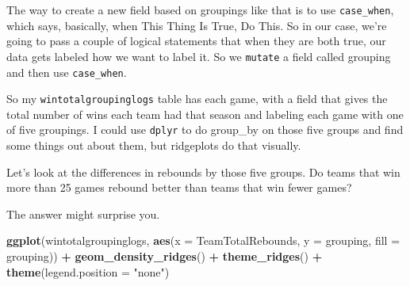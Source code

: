 \documentclass[]{book}
\newenvironment{Shaded}{\begin{snugshade}}{\end{snugshade}}
\newcommand{\DataTypeTok}[1]{\textcolor[rgb]{0.13,0.29,0.53}{#1}}
\newcommand{\DecValTok}[1]{\textcolor[rgb]{0.00,0.00,0.81}{#1}}
\newcommand{\KeywordTok}[1]{\textcolor[rgb]{0.13,0.29,0.53}{\textbf{#1}}}
\newcommand{\NormalTok}[1]{#1}
\newcommand{\OperatorTok}[1]{\textcolor[rgb]{0.81,0.36,0.00}{\textbf{#1}}}
\newcommand{\StringTok}[1]{\textcolor[rgb]{0.31,0.60,0.02}{#1}}
\begin{document}
The way to create a new field based on groupings like that is to use \texttt{case\_when}, which says, basically, when This Thing Is True, Do This. So in our case, we're going to pass a couple of logical statements that when they are both true, our data gets labeled how we want to label it. So we \texttt{mutate} a field called grouping and then use \texttt{case\_when}.

\begin{Shaded}
\end{Shaded}

So my \texttt{wintotalgroupinglogs} table has each game, with a field that gives the total number of wins each team had that season and labeling each game with one of five groupings. I could use \texttt{dplyr} to do group\_by on those five groups and find some things out about them, but ridgeplots do that visually.

Let's look at the differences in rebounds by those five groups. Do teams that win more than 25 games rebound better than teams that win fewer games?

The answer might surprise you.

\begin{Shaded}
\begin{Highlighting}[]
\KeywordTok{ggplot}\NormalTok{(wintotalgroupinglogs, }\KeywordTok{aes}\NormalTok{(}\DataTypeTok{x =}\NormalTok{ TeamTotalRebounds, }\DataTypeTok{y =}\NormalTok{ grouping, }\DataTypeTok{fill =}\NormalTok{ grouping)) }\OperatorTok{+}
\StringTok{  }\KeywordTok{geom_density_ridges}\NormalTok{() }\OperatorTok{+}
\StringTok{  }\KeywordTok{theme_ridges}\NormalTok{() }\OperatorTok{+}\StringTok{ }
\StringTok{  }\KeywordTok{theme}\NormalTok{(}\DataTypeTok{legend.position =} \StringTok{"none"}\NormalTok{)}
\end{Highlighting}
\end{Shaded}
\end{document}
